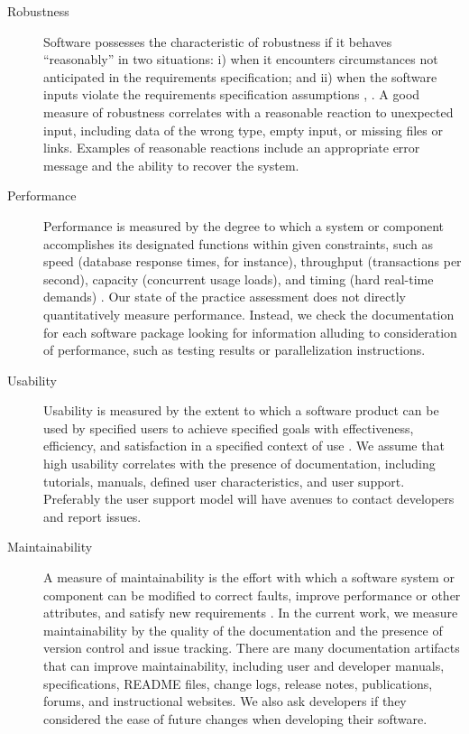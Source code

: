\documentclass[final, 3p, times, authoryear]{elsarticle}
\begin{document}
\begin{description}
	\item[Robustness] Software possesses the characteristic of robustness if it
	behaves ``reasonably'' in two situations: i) when it encounters
	circumstances not anticipated in the requirements specification; and ii)
	when the software inputs violate the requirements specification assumptions
	\citep{boehm2007software}, \citep[p.\ 19]{GhezziEtAl2003}. A good measure of
	robustness correlates with a reasonable reaction to unexpected input,
	including data of the wrong type, empty input, or missing files or links.
	Examples of reasonable reactions include an appropriate error message and the
	ability to recover the system.
	
	\item[Performance] Performance is measured by the degree to which a system
	or component accomplishes its designated functions within given constraints,
	such as speed (database response times, for instance), throughput
	(transactions per second), capacity (concurrent usage loads), and timing
	(hard real-time demands) \citep{IEEEStdGlossarySET1990, wiegers2003softreq}.
	Our state of the practice assessment does not directly quantitatively
	measure performance. Instead, we check the documentation for each software
	package looking for information alluding to consideration of performance,
	such as testing results or parallelization instructions. 
	
	\item[Usability] Usability is measured by the extent to which a software
	product can be used by specified users to achieve specified goals with
	effectiveness, efficiency, and satisfaction in a specified context of use
	\citep{nielsonusability}. We assume that high usability correlates with
	the presence of documentation, including tutorials, manuals, defined
	user characteristics, and user support. Preferably the user support model
	will have avenues to contact developers and report issues.
	
	\item[Maintainability] A measure of maintainability is the effort with which
	a software system or component can be modified to correct faults, improve
	performance or other attributes, and satisfy new requirements
	\citep{IEEEStdGlossarySET1990, boehm2007software}. In the current work, we
	measure maintainability by the quality of the documentation and the presence
	of version control and issue tracking. There are many documentation
	artifacts that can improve maintainability, including user and developer
	manuals, specifications, README files, change logs, release notes,
	publications, forums, and instructional websites. We also ask developers
	if they considered the ease of future changes when developing their
	software. 
	

\end{description}
\end{document}
